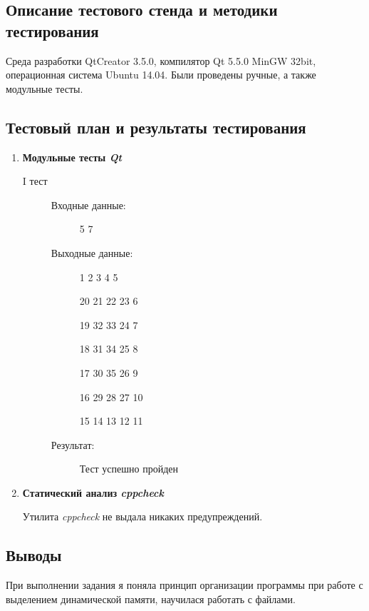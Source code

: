 \documentclass[12pt,a4paper]{report}
\begin{document}
\subsection{Описание тестового стенда и методики тестирования}
Среда разработки QtCreator 3.5.0, компилятор Qt 5.5.0 MinGW 32bit, операционная система Ubuntu 14.04. Были проведены ручные, а также модульные тесты.

\subsection{Тестовый план и результаты тестирования}
\hspace{\parindent}
\begin{enumerate}
\item \textbf{Модульные тесты \textit{Qt}}

\begin{description}
\item[I тест]
\hspace{\parindent}
\begin{flushleft}
\begin{description}
\item[Входные данные:] 5 7
\item[Выходные данные:]
\hspace{\parindent}
\begin{flushleft}
 1  2  3  4  5 

20 21 22 23  6

19 32 33 24  7

18 31 34 25  8

17 30 35 26  9

16 29 28 27 10

15 14 13 12 11
\end{flushleft}
\item[Результат:] Тест успешно пройден
\end{description}
\end{flushleft}
\end{description}

\item \textbf{Статический анализ \textit{cppcheck}}

Утилита \textit{cppcheck} не выдала никаких предупреждений.
\end{enumerate}
\subsection{Выводы}
\hspace{\parindent}
При выполнении задания я поняла принцип организации программы при работе с выделением динамической памяти, научилася работать с файлами.
\end{document}
